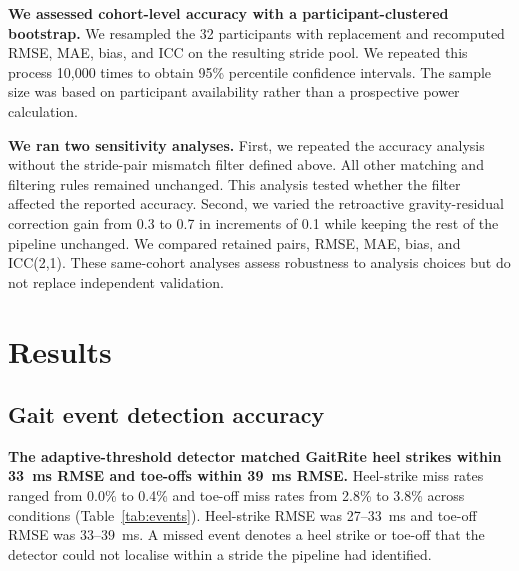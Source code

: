 \documentclass[11pt]{article}
\begin{document}
\textbf{We assessed cohort-level accuracy with a participant-clustered bootstrap.} We resampled the 32 participants with replacement and recomputed RMSE, MAE, bias, and ICC on the resulting stride pool. We repeated this process 10{,}000 times to obtain 95\% percentile confidence intervals. The sample size was based on participant availability rather than a prospective power calculation.

\textbf{We ran two sensitivity analyses.} First, we repeated the accuracy analysis without the stride-pair mismatch filter defined above. All other matching and filtering rules remained unchanged. This analysis tested whether the filter affected the reported accuracy. Second, we varied the retroactive gravity-residual correction gain from 0.3 to 0.7 in increments of 0.1 while keeping the rest of the pipeline unchanged. We compared retained pairs, RMSE, MAE, bias, and ICC(2,1). These same-cohort analyses assess robustness to analysis choices but do not replace independent validation.


\clearpage
\section{Results}

\FloatBarrier
\subsection{Gait event detection accuracy}

\textbf{The adaptive-threshold detector matched GaitRite heel strikes within 33~ms RMSE and toe-offs within 39~ms RMSE.}
Heel-strike miss rates ranged from 0.0\% to 0.4\% and toe-off miss rates from 2.8\% to 3.8\% across conditions (Table~\ref{tab:events}). Heel-strike RMSE was 27--33~ms and toe-off RMSE was 33--39~ms. A missed event denotes a heel strike or toe-off that the detector could not localise within a stride the pipeline had identified.
\end{document}
